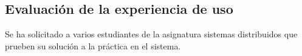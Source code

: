 \documentclass{article}
\begin{document}
\subsection{Evaluación de la experiencia de uso}

Se ha solicitado a varios estudiantes de la asignatura sistemas distribuidos que prueben su solución a la práctica en el sistema.

\subsection{}

%
%
%
%
%
%
%
%


%


%

%
\end{document}
